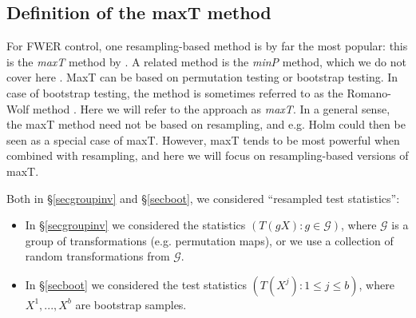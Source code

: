 \documentclass[11pt]{article}
\theoremstyle{plain}
\theoremstyle{definition}
\newcommand{\G}{\mathcal{G}}
\newcommand{\citt}{\citet}
\newcommand{\citp}{\citep}
\begin{document}
\subsection{Definition of the maxT method} \label{secdefmaxT}
For FWER control, one resampling-based method is by far the most popular: this is the \emph{maxT} method by \citt{westfall1993resampling}. A related method is the \emph{minP} method, which we do not cover here \citp{dudoit2008multiple,goeman2014multiple}.  MaxT can be based on permutation testing or bootstrap testing. In case of bootstrap testing, the method is sometimes referred to as the Romano-Wolf method \citp{romano2005stepwise}. Here we will refer to the approach as \emph{maxT}. In a general sense, the maxT method need not be based on resampling, and e.g. Holm could then be seen as a special case of maxT. However, maxT tends to be most powerful when combined with resampling, and here we will focus on resampling-based versions of maxT.



Both in \S\ref{secgroupinv} and \S\ref{secboot}, we considered ``resampled test statistics'': 
\begin{itemize}
\item In \S\ref{secgroupinv} we considered the statistics $(T(gX):g\in\G)$, where $\G$ is a group of transformations (e.g. permutation maps), or we use a collection of random transformations from $\G$.
\item In \S\ref{secboot} we considered the test statistics $(T(X^j): 1\leq j \leq b)$, where $X^1,...,X^b$ are bootstrap samples.
\end{itemize}
\end{document}
